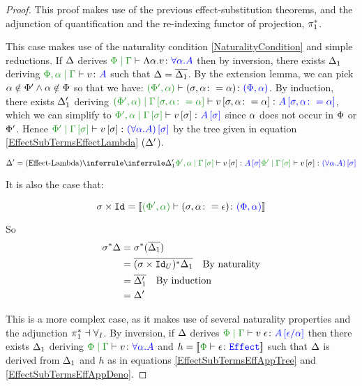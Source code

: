 \documentclass{Report}
\begin{document}
\begin{proof}
    This proof makes use of the previous effect-substitution theorems, and the adjunction of quantification and the re-indexing functor of projection, $\pstar$.


This case makes use of the naturality condition \ref{NaturalityCondition} and simple reductions. 
If $\D$ derives $\gpetyperelation{\elam{\a}{v}}{\all{\a}{A}}$ then by inversion, there exists $\D_1$ deriving  $\etyperelation{\P,\a}{\G}{v}{A}$ such that $\D = \bar{\D_1}$. By the extension lemma, we can pick $\a\notin\P'\wedge\a\notin\P$ so that we have: $\typerelation{(\P',\a)}{(\si, \a\setto\a)}{(\P,\a)}$. By induction, there exists $\D_1'$ deriving $\etyperelation{(\P', \a)}{\G\sub{\si, \a\setto\a}}{v\sub{\si,\a\setto\a}}{A\sub{\si, \a\setto\a}}$, which we can simplify to $\etyperelation{\P',\a}{\G\ssi}{v\ssi}{A\ssi}$ since $\a$ does not occur in $\P$ or $\P'$. Hence $\etyperelation{\P'}{\G\ssi}{v\ssi}{(\all{\a}{A})\ssi}$ by the tree given in equation \ref{EffectSubTermsEffectLambda} ($\D'$).

\begin{equation}\label{EffectSubTermsEffectLambda}
    \D' = \ntreeruleI{Effect-Lambda}{\treeruleI{\D_1'}{\etyperelation{\P',\a}{\G\ssi}{v\ssi}{A\ssi}}}{\etyperelation{\P'}{\G\ssi}{v\ssi}{(\all{\a}{A})\ssi}}
\end{equation}

It is also the case that:

\begin{equation}
    \si\times\Id{} = \deno{\typerelation{(\P',\a)}{(\si, \a\setto\e)}{(\P,\a)}}
\end{equation}

So
\begin{align*}
    \si\star\D &= \si\star(\bar{\D_1})\\
    & = \bar{(\si\times\Id{U})\star\D_1}\qt{By naturality}\\
    & = \bar{\D_1'}\qt{By induction}\\
    & = \D'
\end{align*}


This is a more complex case, as it makes use of several naturality properties and the adjunction $\pstar\dashv\allI$. By inversion, if $\D$ derives $\gpetyperelation{\eapp{v}{\e}}{A\ssub{\a}{\e}}$ then there exists $\D_1$ deriving $\gpetyperelation{v}{\all{\a}{A}}$ and $h = \deno{\typerelation{\P}{\e}{\effect}}$ such that $\D$ is derived from $\D_1$ and $h$ as in equations \ref{EffectSubTermsEffAppTree} and \ref{EffectSubTermsEffAppDeno}.



\end{proof}
\end{document}
